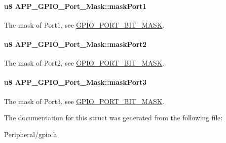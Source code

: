 \paragraph[{\texorpdfstring{mask\+Port1}{maskPort1}}]{\setlength{\rightskip}{0pt plus 5cm}u8 A\+P\+P\+\_\+\+G\+P\+I\+O\+\_\+\+Port\+\_\+\+Mask\+::mask\+Port1}\hypertarget{struct_a_p_p___g_p_i_o___port___mask_a668d0ac7f6723ae8f44471e13d7feb28}{}\label{struct_a_p_p___g_p_i_o___port___mask_a668d0ac7f6723ae8f44471e13d7feb28}
The mask of Port1, see \hyperlink{group___g_p_i_o___p_o_r_t___b_i_t___m_a_s_k}{G\+P\+I\+O\+\_\+\+P\+O\+R\+T\+\_\+\+B\+I\+T\+\_\+\+M\+A\+SK}. 
\paragraph[{\texorpdfstring{mask\+Port2}{maskPort2}}]{\setlength{\rightskip}{0pt plus 5cm}u8 A\+P\+P\+\_\+\+G\+P\+I\+O\+\_\+\+Port\+\_\+\+Mask\+::mask\+Port2}\hypertarget{struct_a_p_p___g_p_i_o___port___mask_a7e6a3e18323c5dc5f42fd1e4a0867754}{}\label{struct_a_p_p___g_p_i_o___port___mask_a7e6a3e18323c5dc5f42fd1e4a0867754}
The mask of Port2, see \hyperlink{group___g_p_i_o___p_o_r_t___b_i_t___m_a_s_k}{G\+P\+I\+O\+\_\+\+P\+O\+R\+T\+\_\+\+B\+I\+T\+\_\+\+M\+A\+SK}. 
\paragraph[{\texorpdfstring{mask\+Port3}{maskPort3}}]{\setlength{\rightskip}{0pt plus 5cm}u8 A\+P\+P\+\_\+\+G\+P\+I\+O\+\_\+\+Port\+\_\+\+Mask\+::mask\+Port3}\hypertarget{struct_a_p_p___g_p_i_o___port___mask_a233327841d9ab57dc110d196440f3c4f}{}\label{struct_a_p_p___g_p_i_o___port___mask_a233327841d9ab57dc110d196440f3c4f}
The mask of Port3, see \hyperlink{group___g_p_i_o___p_o_r_t___b_i_t___m_a_s_k}{G\+P\+I\+O\+\_\+\+P\+O\+R\+T\+\_\+\+B\+I\+T\+\_\+\+M\+A\+SK}. 

The documentation for this struct was generated from the following file\+:\begin{DoxyCompactItemize}
\item 
Peripheral/gpio.\+h\end{DoxyCompactItemize}
